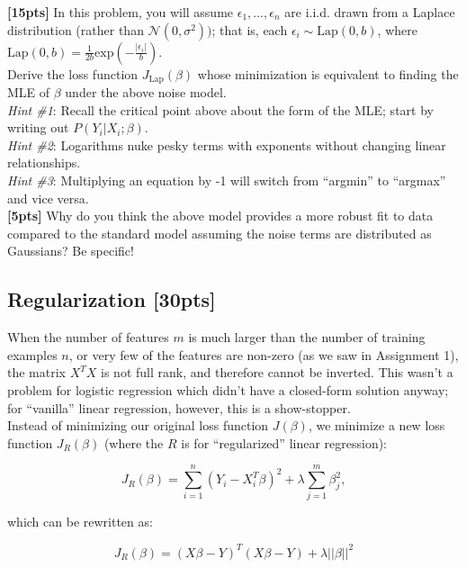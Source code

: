 \documentclass[paper=a4, fontsize=11pt]{scrartcl} %
\numberwithin{figure}{section} %
\numberwithin{table}{section} %
\begin{document}
\textbf{[15pts]} In this problem, you will assume $\epsilon_1, ..., \epsilon_n$ are i.i.d. drawn from a Laplace distribution (rather than $\mathcal{N}(0, \sigma^2))$; that is, each $\epsilon_i \sim \textrm{Lap}(0, b)$, where $\textrm{Lap}(0, b) = \frac{1}{2b} \textrm{exp}(-\frac{|\epsilon_i|}{b} )$. \\

Derive the loss function $J_{\textrm{Lap}}(\beta)$ whose minimization is equivalent to finding the MLE of $\beta$ under the above noise model. \\

\emph{Hint \#1}: Recall the critical point above about the form of the MLE; start by writing out $P(Y_i | X_i; \beta)$. \\

\emph{Hint \#2}: Logarithms nuke pesky terms with exponents without changing linear relationships. \\

\emph{Hint \#3}: Multiplying an equation by -1 will switch from ``argmin'' to ``argmax'' and vice versa. \\

\textbf{[5pts]} Why do you think the above model provides a more robust fit to data compared to the standard model assuming the noise terms are distributed as Gaussians? Be specific!

\subsection{Regularization \textbf{[30pts]}}

When the number of features $m$ is much larger than the number of training examples $n$, or very few of the features are non-zero (as we saw in Assignment 1), the matrix $X^TX$ is not full rank, and therefore cannot be inverted. This wasn't a problem for logistic regression which didn't have a closed-form solution anyway; for ``vanilla'' linear regression, however, this is a show-stopper. \\

Instead of minimizing our original loss function $J(\beta)$, we minimize a new loss function $J_R(\beta)$ (where the $R$ is for ``regularized'' linear regression):

$$
J_R(\beta) = \sum_{i = 1}^n (Y_i - X_i^T \beta)^2 + \lambda \sum_{j = 1}^m \beta_j^2,
$$

which can be rewritten as:

\begin{equation}
J_R(\beta) = (X\beta - Y)^T(X\beta - Y) + \lambda ||\beta||^2
\label{eq:reg}
\end{equation}
\end{document}
